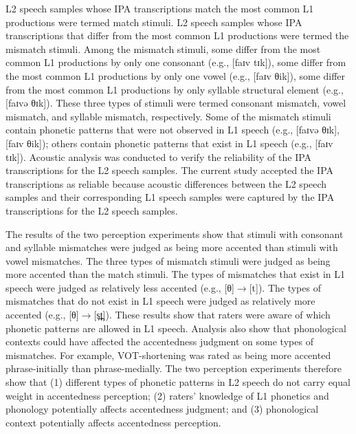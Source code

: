L2 speech samples whose IPA transcriptions match the most common L1 productions were termed match stimuli. L2 speech samples whose IPA transcriptions that differ from the most common L1 productions were termed the mismatch stimuli. Among the mismatch stimuli, some differ from the most common L1 productions by only one consonant (e.g., [faɪv tɪk]), some differ from the most common L1 productions by only one vowel (e.g., [faɪv θik]), some differ from the most common L1 productions by only syllable structural element (e.g., [faɪvə θɪk]). These three types of stimuli were termed consonant mismatch, vowel mismatch, and syllable mismatch, respectively. Some of the mismatch stimuli contain phonetic patterns that were not observed in L1 speech (e.g., [faɪvə θɪk], [faɪv θik]); others contain phonetic patterns that exist in L1 speech (e.g., [faɪv tɪk]). Acoustic analysis was conducted to verify the reliability of the IPA transcriptions for the L2 speech samples. The current study accepted the IPA transcriptions as reliable because acoustic differences between the L2 speech samples and their corresponding L1 speech samples were captured by the IPA transcriptions for the L2 speech samples.


The results of the two perception experiments show that stimuli with consonant and syllable mismatches were judged as being more accented than stimuli with vowel mismatches. The three types of mismatch stimuli were judged as being more accented than the match stimuli. The types of mismatches that exist in L1 speech were judged as relatively less accented (e.g., [θ]$\rightarrow$[t]). The types of mismatches that do not exist in L1 speech were judged as relatively more accented (e.g., [θ]$\rightarrow$[s̪t̪]). These results show that raters were aware of which phonetic patterns are allowed in L1 speech. Analysis also show that phonological contexts could have affected the accentedness judgment on some types of mismatches. For example, VOT-shortening was rated as being more accented phrase-initially than phrase-medially. The two perception experiments therefore show that (1) different types of phonetic patterns in L2 speech do not carry equal weight in accentedness perception; (2) raters’ knowledge of L1 phonetics and phonology potentially affects accentedness judgment; and (3) phonological context potentially affects accentedness perception.


